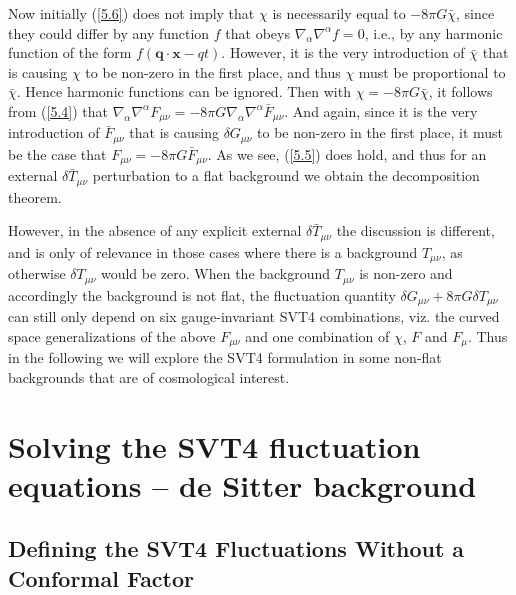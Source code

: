 \documentclass[aps,onecolumn,10pt]{revtex4}
\numberwithin{equation}{section}
\numberwithin{equation}{section}
\begin{document}
Now initially (\ref{5.6})  does not imply that $\chi$ is necessarily equal to $-8\pi G\bar{\chi}$, since they could differ by any function $f$ that obeys $\nabla_{\alpha}\nabla^{\alpha}f=0$, i.e., by any harmonic function of the form $f(\mathbf{q}\cdot\mathbf{x}-q t)$. However, it is the very introduction of $\bar{\chi}$ that is causing $\chi$ to be non-zero in the first place, and thus $\chi$ must be proportional to $\bar{\chi}$. Hence harmonic functions can be ignored. Then with  $\chi=-8\pi G\bar{\chi}$, it follows from (\ref{5.4}) that $\nabla_{\alpha}\nabla^{\alpha}F_{\mu\nu}=-8 \pi G\nabla_{\alpha}\nabla^{\alpha}\bar{F}_{\mu\nu}$. And again, since it is the very introduction of $\bar{F}_{\mu\nu}$ that is causing $\delta G_{\mu\nu}$ to be non-zero in the first place, it must be the case that $F_{\mu\nu}=-8 \pi G\bar{F}_{\mu\nu}$. As we see, (\ref{5.5}) does hold, and thus for an external $\delta \bar{T}_{\mu\nu}$ perturbation to a flat background we  obtain the decomposition theorem.

However, in the absence of any explicit external $\delta \bar{T}_{\mu\nu}$ the discussion is different, and is only of relevance in those cases where there is a background $T_{\mu\nu}$, as otherwise $\delta T_{\mu\nu}$ would be zero. When the background $T_{\mu\nu}$ is non-zero and accordingly the background is not flat, the fluctuation quantity $\delta G_{\mu\nu}+8\pi G \delta T_{\mu\nu}$ can still only depend on six gauge-invariant SVT4 combinations, viz. the curved space generalizations of the above $F_{\mu\nu}$ and one combination of $\chi$, $F$ and $F_{\mu}$. Thus in the following we will explore the SVT4 formulation in some non-flat backgrounds that are of cosmological interest.

\section{Solving the SVT4 fluctuation equations -- de Sitter background}
\label{S6}
\subsection{Defining the SVT4 Fluctuations Without a Conformal Factor}
\end{document}
